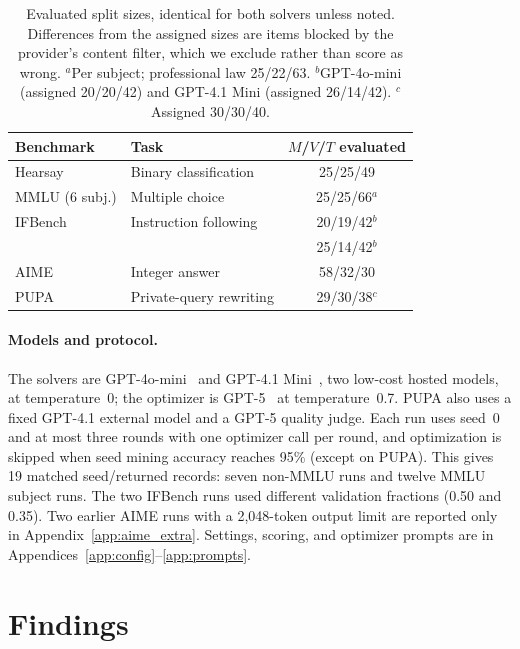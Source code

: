 \documentclass[11pt]{article}
\begin{document}
\begin{table}[!t]
\centering
\small
\setlength{\tabcolsep}{4pt}
\begin{tabular}{llc}
\toprule
\rowcolor{midblue}
Benchmark & Task & $M$/$V$/$T$ evaluated \\
\midrule
Hearsay & Binary classification & 25/25/49 \\
MMLU (6 subj.) & Multiple choice & 25/25/66$^{a}$ \\
IFBench & Instruction following & 20/19/42$^{b}$ \\
 & & 25/14/42$^{b}$ \\
AIME & Integer answer & 58/32/30 \\
PUPA & Private-query rewriting & 29/30/38$^{c}$ \\
\bottomrule
\end{tabular}
\caption{Evaluated split sizes, identical for both solvers unless noted. Differences from the assigned sizes are items blocked by the provider's content filter, which we exclude rather than score as wrong. $^{a}$Per subject; professional law 25/22/63. $^{b}$GPT-4o-mini (assigned 20/20/42) and GPT-4.1 Mini (assigned 26/14/42). $^{c}$Assigned 30/30/40.}
\label{tab:setup}
\end{table}

\paragraph{Models and protocol.}
The solvers are GPT-4o-mini~\citep{openai2024gpt4o} and GPT-4.1 Mini~\citep{openai2025gpt41}, two low-cost hosted models, at temperature~0; the optimizer is GPT-5~\citep{openai2025gpt5} at temperature~0.7. PUPA also uses a fixed GPT-4.1 external model and a GPT-5 quality judge. Each run uses seed~0 and at most three rounds with one optimizer call per round, and optimization is skipped when seed mining accuracy reaches 95\% (except on PUPA). This gives 19 matched seed/returned records: seven non-MMLU runs and twelve MMLU subject runs. The two IFBench runs used different validation fractions (0.50 and 0.35). Two earlier AIME runs with a 2,048-token output limit are reported only in Appendix~\ref{app:aime_extra}. Settings, scoring, and optimizer prompts are in Appendices~\ref{app:config}--\ref{app:prompts}.

\section{Findings}
\label{sec:results}
\end{document}
